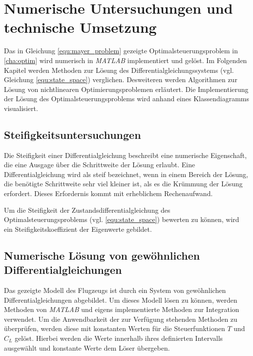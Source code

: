 \chapter{Numerische Untersuchungen und technische Umsetzung} \label{kap:TUNU}
Das in Gleichung \eqref{equ:mayer_problem} gezeigte Optimalsteuerungsproblem in \autoref{cha:optim} wird numerisch in \textit{MATLAB} implementiert und gelöst. Im Folgenden Kapitel werden Methoden zur Lösung des Differentialgleichungssystems (vgl. Gleichung \eqref{equ:state_space}) verglichen. Desweiteren werden Algorithmen zur Lösung von nichtlinearen Optimierungsproblemen erläutert. Die Implementierung der Lösung des Optimalsteuerungsproblems wird anhand eines Klassendiagramms visualisiert.

\section{Steifigkeitsuntersuchungen}
Die Steifigkeit einer Differentialgleichung beschreibt eine numerische Eigenschaft, die eine Ausgage über die Schrittweite der Lösung erlaubt. Eine Differentialgleichung wird als steif bezeichnet, wenn in einem Bereich der Lösung, die benötigte Schrittweite sehr viel kleiner ist, als es die Krümmung der Lösung erfordert. Dieses Erfordernis kommt mit erheblichem Rechenaufwand.

Um die Steifigkeit der Zustandsdifferentialgleichung des Optimalsteuerungsproblems (vgl. \eqref{equ:state_space}) bewerten zu können, wird ein Steifigkeitskoeffizient der Eigenwerte gebildet.



\section{Numerische Lösung von gewöhnlichen Differentialgleichungen} \label{sec:num_ode}
Das gezeigte Modell des Flugzeugs ist durch ein System von gewöhnlichen Differentialgleichungen abgebildet. Um dieses Modell lösen zu können, werden Methoden von \textit{MATLAB} und eigens implementierte Methoden zur Integration verwendet.
Um die Anwendbarkeit der zur Verfügung stehenden Methoden zu überprüfen, werden diese mit konstanten Werten für die Steuerfunktionen \(T\) und \(C_L\) gelöst. Hierbei werden die Werte innerhalb ihres definierten Intervalls ausgewählt und konstante Werte dem Löser übergeben.

